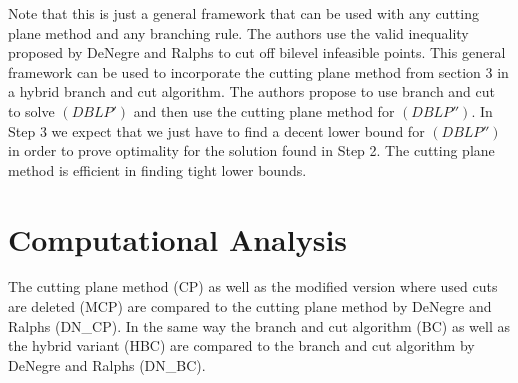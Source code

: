 \documentclass{article}
\begin{document}
Note that this is just a general framework that can be used with any cutting plane method and any branching rule. The authors use the valid inequality proposed by DeNegre and Ralphs \cite{DeNegre2009} to cut off bilevel infeasible points. 
This general framework can be used to incorporate the cutting plane method from section 3 in a hybrid branch and cut algorithm. The authors propose to use branch and cut to solve $(DBLP')$ and then use the cutting plane method for $(DBLP'')$. In Step 3 we expect that we just have to find a decent lower bound for $(DBLP'')$ in order to prove optimality for the solution found in Step 2. The cutting plane method is efficient in finding tight lower bounds. 

\section{Computational Analysis}

The cutting plane method (CP) as well as the modified version where used cuts are deleted (MCP) are compared to the cutting plane method by DeNegre and Ralphs (DN\_CP).
In the same way the branch and cut algorithm (BC) as well as the hybrid variant (HBC) are compared to the branch and cut algorithm by DeNegre and Ralphs (DN\_BC).
\end{document}
